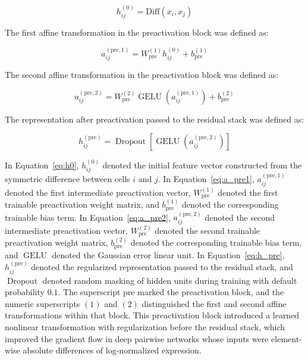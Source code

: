 \documentclass[11pt]{article}
\begin{document}
\begin{equation}
h_{ij}^{(0)}=\mathrm{Diff}(x_i,x_j)
  \label{eq:h0}
\end{equation}

The first affine transformation in the preactivation block was defined as:

\begin{equation}
a_{ij}^{(\mathrm{pre},1)}=
W_{\mathrm{pre}}^{(1)}h_{ij}^{(0)}+
b_{\mathrm{pre}}^{(1)}
  \label{eq:a_pre1}
\end{equation}

The second affine transformation in the preactivation block was defined as:

\begin{equation}
a_{ij}^{(\mathrm{pre},2)}=
W_{\mathrm{pre}}^{(2)}
\operatorname{GELU}\left(a_{ij}^{(\mathrm{pre},1)}\right)+
b_{\mathrm{pre}}^{(2)}
  \label{eq:a_pre2}
\end{equation}


The representation after preactivation passed to the residual stack was defined as:

\begin{equation}
h_{ij}^{(\mathrm{pre})}=
\operatorname{Dropout}
\left[
\operatorname{GELU}
\left(
a_{ij}^{(\mathrm{pre},2)}
\right)
\right]
  \label{eq:h_pre}
\end{equation}

In Equation~\ref{eq:h0}, $h_{ij}^{(0)}$ denoted the initial feature vector constructed from the symmetric difference between cells $i$ and $j$. In Equation~\ref{eq:a_pre1}, $a_{ij}^{(\mathrm{pre},1)}$ denoted the first intermediate preactivation vector, $W_{\mathrm{pre}}^{(1)}$ denoted the first trainable preactivation weight matrix, and $b_{\mathrm{pre}}^{(1)}$ denoted the corresponding trainable bias term. In Equation~\ref{eq:a_pre2}, $a_{ij}^{(\mathrm{pre},2)}$ denoted the second intermediate preactivation vector, $W_{\mathrm{pre}}^{(2)}$ denoted the second trainable preactivation weight matrix, $b_{\mathrm{pre}}^{(2)}$ denoted the corresponding trainable bias term, and $\operatorname{GELU}$ denoted the Gaussian error linear unit. In Equation~\ref{eq:h_pre}, $h_{ij}^{(\mathrm{pre})}$ denoted the regularized representation passed to the residual stack, and $\operatorname{Dropout}$ denoted random masking of hidden units during training with default probability $0.1$. The superscript $\mathrm{pre}$ marked the preactivation block, and the numeric superscripts $(1)$ and $(2)$ distinguished the first and second affine transformations within that block. This preactivation block introduced a learned nonlinear transformation with regularization before the residual stack, which improved the gradient flow in deep pairwise networks whose inputs were element-wise absolute differences of log-normalized expression.
\end{document}

